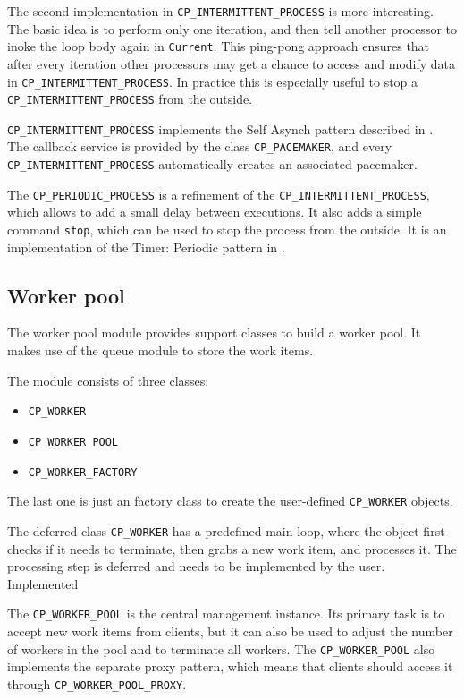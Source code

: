 \documentclass[a4paper,10pt]{report}
\begin{document}
The second implementation in \lstinline!CP_INTERMITTENT_PROCESS! is more interesting.
The basic idea is to perform only one iteration, and then tell another processor to inoke the loop body again in \lstinline!Current!.
This ping-pong approach ensures that after every iteration other processors may get a chance to access and modify data in \lstinline!CP_INTERMITTENT_PROCESS!.
In practice this is especially useful to stop a \lstinline!CP_INTERMITTENT_PROCESS! from the outside.

\lstinline!CP_INTERMITTENT_PROCESS! implements the Self Asynch pattern described in .
The callback service is provided by the class \lstinline!CP_PACEMAKER!, and every \lstinline!CP_INTERMITTENT_PROCESS! automatically creates an associated pacemaker.

The \lstinline!CP_PERIODIC_PROCESS! is a refinement of the \lstinline!CP_INTERMITTENT_PROCESS!, which allows to add a small delay between executions.
It also adds a simple command \lstinline!stop!, which can be used to stop the process from the outside.
It is an implementation of the Timer: Periodic pattern in .

\subsection{Worker pool}

The worker pool module provides support classes to build a worker pool.
It makes use of the queue module to store the work items.

The module consists of three classes:

\begin{itemize}
 \item \lstinline!CP_WORKER!
 \item \lstinline!CP_WORKER_POOL!
 \item \lstinline!CP_WORKER_FACTORY!
\end{itemize}

The last one is just an factory class to create the user-defined \lstinline!CP_WORKER! objects.

The deferred class \lstinline!CP_WORKER! has a predefined main loop, where the object first checks if it needs to terminate, then grabs a new work item, and processes it.
The processing step is deferred and needs to be implemented by the user.
Implemented

The \lstinline!CP_WORKER_POOL! is the central management instance.
Its primary task is to accept new work items from clients, but it can also be used to adjust the number of workers in the pool and to terminate all workers.
The \lstinline!CP_WORKER_POOL! also implements the separate proxy pattern, which means that clients should access it through \lstinline!CP_WORKER_POOL_PROXY!.
\end{document}
